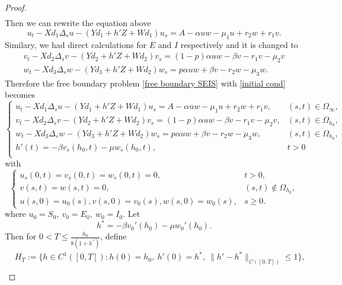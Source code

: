 \documentclass[11pt]{amsart}
\numberwithin{equation}{section}
\theoremstyle{plain}
\theoremstyle{definition}
\begin{document}
\begin{proof}
\begin{align*}
		\end{align*}
		Then we can rewrite the equation above
		\begin{equation*}
			u_t-Xd_1\Delta_s u-(Yd_1+h'Z+Wd_1)u_s=A-\alpha uw-\mu_1u+r_2w+r_1v.
		\end{equation*}
		Similary, we had direct calculations for $E$ and $I$ respectively and it is changed to
		\begin{equation*}
			\begin{aligned}
				v_t-Xd_2\Delta_s v-(Yd_2+h'Z+Wd_2)v_s=(1-p)\alpha uw-\beta v-r_1v-\mu_2v
				\\
				w_t-Xd_3\Delta_s w-(Yd_3+h'Z+Wd_2)w_s=p\alpha uw+\beta v-r_2w-\mu_3w.
			\end{aligned}
		\end{equation*}
		Therefore the free boundary problem \cref{free boundary SEIS} with \cref{initial cond} becomes
		\begin{equation} \label{modified free boundary SEIS1}
			\begin{cases}
				u_t-Xd_1\Delta_s u-(Yd_1+h'Z+Wd_1)u_s
				=A-\alpha uw-\mu_1u+r_2w+r_1v, &(s,t)\in\Omega_\infty,\\
				v_t-Xd_2\Delta_s v-(Yd_2+h'Z+Wd_2)v_s
				=(1-p)\alpha uw-\beta v-r_1v-\mu_2v, &(s,t)\in\Omega_{h_0}, \\
				w_t-Xd_3\Delta_s w-(Yd_3+h'Z+Wd_2)w_s
				=p\alpha uw+\beta v-r_2w-\mu_3w, &(s,t)\in\Omega_{h_0},\ \\
				h'(t)=-\beta v_s(h_0,t)-\mu w_s(h_0,t), &t>0\\
			\end{cases}
		\end{equation}
		with
		\begin{equation} \label{modified free boundary SEIS2}
			\begin{cases}
				u_s(0,t)=v_s(0,t)=w_s(0,t)=0, &t>0, \\
				v(s,t)=w(s,t)=0, &(s,t)\notin\Omega_{h_0}, \\
				u(s,0)=u_0(s), v(s,0)=v_0(s), w(s,0)=w_0(s), &s \geq 0.
			\end{cases}
		\end{equation}
		where $u_0=S_0,\ v_0=E_0,\ w_0=I_0$.
		Let
		\begin{equation*}h^*=-\beta v_0'(h_0)-\mu w_0'(h_0).
		\end{equation*}
		Then for $0<T\leq\frac{h_0}{8(1+h^*)}$,
		define
		\begin{equation*}
			\begin{aligned}
			&H_T :=\big\{h\in C^1([0,T]):h(0)=h_0,\ h'(0)=h^*,\ \lVert h'-h^*\rVert_{C([0,T])}\leq 1\big\},\\

\end{aligned}
\end{equation*}
\end{proof}
\end{document}
